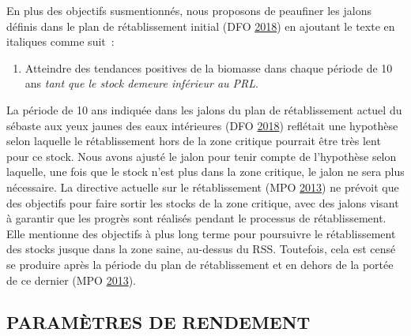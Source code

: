 \documentclass[french,11pt]{book}
\begin{document}
En plus des objectifs susmentionnés, nous proposons de peaufiner les jalons définis dans le plan de rétablissement initial (DFO \protect\hyperlink{ref-ifmp2018}{2018}) en ajoutant le texte en italiques comme suit~:
\begin{enumerate}
\def\labelenumi{\arabic{enumi}.}
\setcounter{enumi}{5}

\item
  Atteindre des tendances positives de la biomasse dans chaque période de 10 ans \emph{tant que le stock demeure inférieur au PRL}.
\end{enumerate}
La période de 10 ans indiquée dans les jalons du plan de rétablissement actuel du sébaste aux yeux jaunes des eaux intérieures (DFO \protect\hyperlink{ref-ifmp2018}{2018}) reflétait une hypothèse selon laquelle le rétablissement hors de la zone critique pourrait être très lent pour ce stock. Nous avons ajusté le jalon pour tenir compte de l'hypothèse selon laquelle, une fois que le stock n'est plus dans la zone critique, le jalon ne sera plus nécessaire. La directive actuelle sur le rétablissement (MPO \protect\hyperlink{ref-dfo2013}{2013}) ne prévoit que des objectifs pour faire sortir les stocks de la zone critique, avec des jalons visant à garantir que les progrès sont réalisés pendant le processus de rétablissement. Elle mentionne des objectifs à plus long terme pour poursuivre le rétablissement des stocks jusque dans la zone saine, au-dessus du RSS. Toutefois, cela est censé se produire après la période du plan de rétablissement et en dehors de la portée de ce dernier (MPO \protect\hyperlink{ref-dfo2013}{2013}).

\hypertarget{sec:objectives-metrics-pm}{%
\subsection{PARAMÈTRES DE RENDEMENT}\label{sec:objectives-metrics-pm}}
\end{document}
